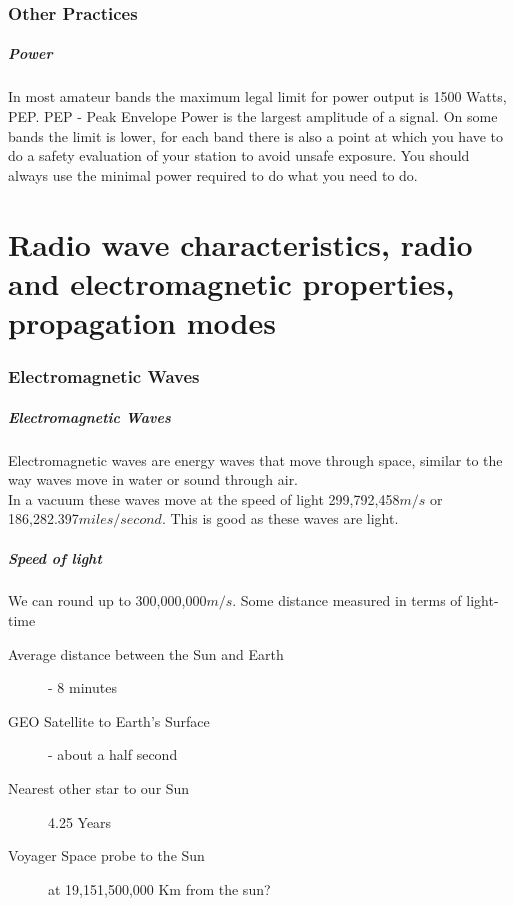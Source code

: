 \documentclass[10pt, handout]{beamer}
\begin{document}
\section{Other Practices}

\begin{frame}
\frametitle{Power}
In most amateur bands the maximum legal limit for power output is 1500 Watts, PEP. PEP - Peak Envelope Power is the largest amplitude of a signal. On some bands the limit is lower, for each band there is also a point at which you have to do a safety evaluation of your station to avoid unsafe exposure. You should always use the minimal power required to do what you need to do.
\end{frame}


\part{Radio wave characteristics, radio and electromagnetic properties, propagation modes}
\section{Electromagnetic Waves}

\begin{frame}
\frametitle{Electromagnetic Waves}
Electromagnetic waves are energy waves that move through space, similar to the way waves move in water or sound through air.\\
In a vacuum these waves move at the speed of light 299,792,458$m/s$ or 186,282.397$miles/second$. This is good as these waves are light.
\end{frame}

\begin{frame}
\frametitle{Speed of light}
We can round up to 300,000,000$m/s$. Some distance measured in terms of light-time
\begin{description}
\item[Average distance between the Sun and Earth] - 8 minutes
\item[GEO Satellite to Earth's Surface] - about a half second
\item[Nearest other star to our Sun] 4.25 Years
\item[Voyager Space probe to the Sun] at 19,151,500,000 Km from the sun?  
\end{description}
\end{frame}
\end{document}
